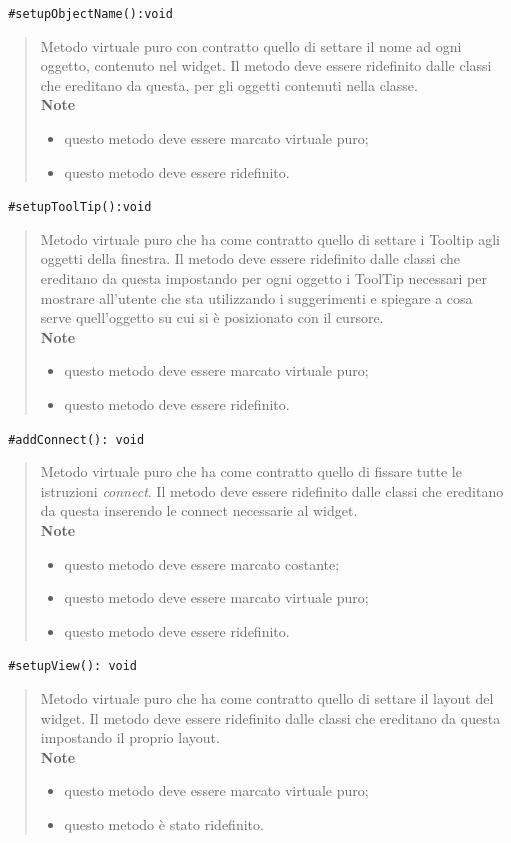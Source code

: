 \color{blue}\verb! #setupObjectName():void!
\begin{quote}
\color{black} Metodo virtuale puro con contratto quello di settare il nome ad ogni oggetto, contenuto nel widget. Il metodo deve essere ridefinito dalle classi che ereditano da questa, per gli oggetti contenuti nella classe. \\
 \textbf{Note}
 \begin{itemize}
 \item questo metodo deve essere marcato virtuale puro;
 \item questo metodo deve essere ridefinito.
 \end{itemize}
\end{quote} 
\color{blue}\verb! #setupToolTip():void!
\begin{quote}
\color{black} Metodo virtuale puro che ha come contratto quello di settare i Tooltip\g{} agli oggetti della finestra. Il metodo deve essere ridefinito dalle classi che ereditano da questa impostando per ogni oggetto i ToolTip necessari per mostrare all'utente che sta utilizzando \project{} i suggerimenti e  spiegare a cosa serve quell'oggetto su cui si è posizionato con il cursore. \\
 \textbf{Note}
 \begin{itemize}
 \item questo metodo deve essere marcato virtuale puro;
 \item questo metodo deve essere ridefinito.
 \end{itemize}
\end{quote} 
\color{blue}\verb! #addConnect(): void!
\begin{quote}
\color{black} Metodo virtuale puro che ha come contratto quello di fissare tutte le istruzioni \emph{connect}. Il metodo deve essere ridefinito dalle classi che ereditano da questa inserendo le connect necessarie al widget.\\ 
 \textbf{Note}
 \begin{itemize}
 \item questo metodo deve essere marcato costante;
 \item questo metodo deve essere marcato virtuale puro;
 \item questo metodo deve essere ridefinito.
 \end{itemize}
\end{quote} 
\color{blue}\verb! #setupView(): void !
\begin{quote}
\color{black} Metodo virtuale puro che ha come contratto quello di settare il layout del widget. Il metodo deve essere ridefinito dalle classi che ereditano da questa impostando il proprio layout.\\
 \textbf{Note}
 \begin{itemize}
 \item questo metodo deve essere marcato virtuale puro;
 \item questo metodo è stato ridefinito.
 \end{itemize}
\end{quote} 
